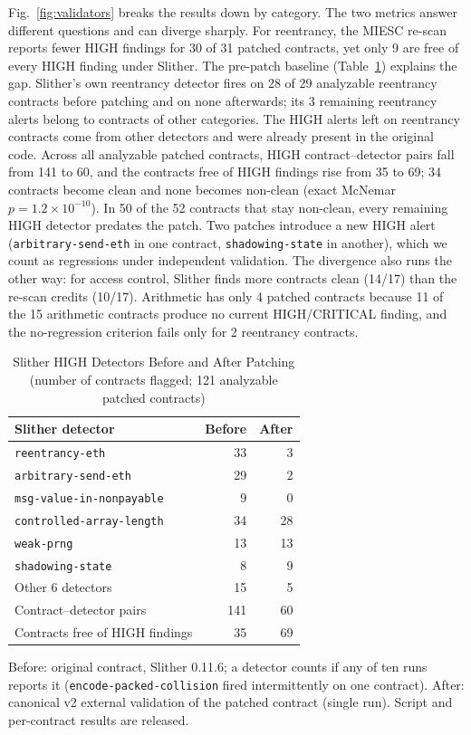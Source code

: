 \documentclass[conference]{IEEEtran}
\begin{document}
Fig.~\ref{fig:validators} breaks the results down by category. The two metrics answer different questions and can diverge sharply. For reentrancy, the MIESC re-scan reports fewer HIGH findings for 30 of 31 patched contracts, yet only 9 are free of every HIGH finding under Slither. The pre-patch baseline (Table~\ref{tab:prepost}) explains the gap. Slither's own reentrancy detector fires on 28 of 29 analyzable reentrancy contracts before patching and on none afterwards; its 3 remaining reentrancy alerts belong to contracts of other categories. The HIGH alerts left on reentrancy contracts come from other detectors and were already present in the original code. Across all analyzable patched contracts, HIGH contract--detector pairs fall from 141 to 60, and the contracts free of HIGH findings rise from 35 to 69; 34 contracts become clean and none becomes non-clean (exact McNemar $p=1.2\times10^{-10}$). In 50 of the 52 contracts that stay non-clean, every remaining HIGH detector predates the patch. Two patches introduce a new HIGH alert (\texttt{arbitrary-send-eth} in one contract, \texttt{shadowing-state} in another), which we count as regressions under independent validation. The divergence also runs the other way: for access control, Slither finds more contracts clean (14/17) than the re-scan credits (10/17). Arithmetic has only 4 patched contracts because 11 of the 15 arithmetic contracts produce no current HIGH/CRITICAL finding, and the no-regression criterion fails only for 2 reentrancy contracts.

\begin{table}[htbp]
\caption{Slither HIGH Detectors Before and After Patching (number of contracts flagged; 121 analyzable patched contracts)}
\label{tab:prepost}
\centering
\footnotesize
\begin{tabular}{@{}lrr@{}}
\toprule
\textbf{Slither detector} & \textbf{Before} & \textbf{After} \\
\midrule
\texttt{reentrancy-eth} & 33 & 3 \\
\texttt{arbitrary-send-eth} & 29 & 2 \\
\texttt{msg-value-in-nonpayable} & 9 & 0 \\
\texttt{controlled-array-length} & 34 & 28 \\
\texttt{weak-prng} & 13 & 13 \\
\texttt{shadowing-state} & 8 & 9 \\
Other 6 detectors & 15 & 5 \\
\midrule
Contract--detector pairs & 141 & 60 \\
Contracts free of HIGH findings & 35 & 69 \\
\bottomrule
\end{tabular}

\vspace{2pt}
\scriptsize{Before: original contract, Slither 0.11.6; a detector counts if any of ten runs reports it (\texttt{encode-packed-collision} fired intermittently on one contract). After: canonical v2 external validation of the patched contract (single run). Script and per-contract results are released.}
\end{table}
\end{document}
